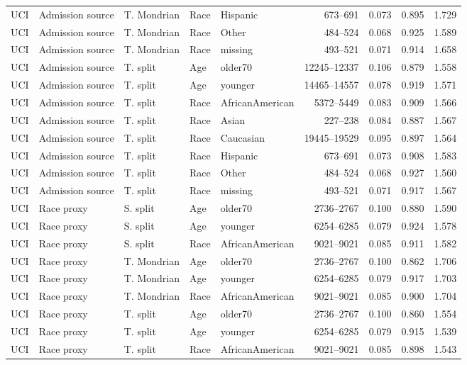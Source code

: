 \begin{longtable}{L{0.9cm}L{1.55cm}L{1.45cm}L{1.1cm}L{1.8cm}r r r r}
UCI & Admission source & T. Mondrian & Race & Hispanic & 673--691 & 0.073 & 0.895 & 1.729 \\
UCI & Admission source & T. Mondrian & Race & Other & 484--524 & 0.068 & 0.925 & 1.589 \\
UCI & Admission source & T. Mondrian & Race & missing & 493--521 & 0.071 & 0.914 & 1.658 \\
UCI & Admission source & T. split & Age & older70 & 12245--12337 & 0.106 & 0.879 & 1.558 \\
UCI & Admission source & T. split & Age & younger & 14465--14557 & 0.078 & 0.919 & 1.571 \\
UCI & Admission source & T. split & Race & AfricanAmerican & 5372--5449 & 0.083 & 0.909 & 1.566 \\
UCI & Admission source & T. split & Race & Asian & 227--238 & 0.084 & 0.887 & 1.567 \\
UCI & Admission source & T. split & Race & Caucasian & 19445--19529 & 0.095 & 0.897 & 1.564 \\
UCI & Admission source & T. split & Race & Hispanic & 673--691 & 0.073 & 0.908 & 1.583 \\
UCI & Admission source & T. split & Race & Other & 484--524 & 0.068 & 0.927 & 1.560 \\
UCI & Admission source & T. split & Race & missing & 493--521 & 0.071 & 0.917 & 1.567 \\
UCI & Race proxy & S. split & Age & older70 & 2736--2767 & 0.100 & 0.880 & 1.590 \\
UCI & Race proxy & S. split & Age & younger & 6254--6285 & 0.079 & 0.924 & 1.578 \\
UCI & Race proxy & S. split & Race & AfricanAmerican & 9021--9021 & 0.085 & 0.911 & 1.582 \\
UCI & Race proxy & T. Mondrian & Age & older70 & 2736--2767 & 0.100 & 0.862 & 1.706 \\
UCI & Race proxy & T. Mondrian & Age & younger & 6254--6285 & 0.079 & 0.917 & 1.703 \\
UCI & Race proxy & T. Mondrian & Race & AfricanAmerican & 9021--9021 & 0.085 & 0.900 & 1.704 \\
UCI & Race proxy & T. split & Age & older70 & 2736--2767 & 0.100 & 0.860 & 1.554 \\
UCI & Race proxy & T. split & Age & younger & 6254--6285 & 0.079 & 0.915 & 1.539 \\
UCI & Race proxy & T. split & Race & AfricanAmerican & 9021--9021 & 0.085 & 0.898 & 1.543 \\
\bottomrule\end{longtable}
